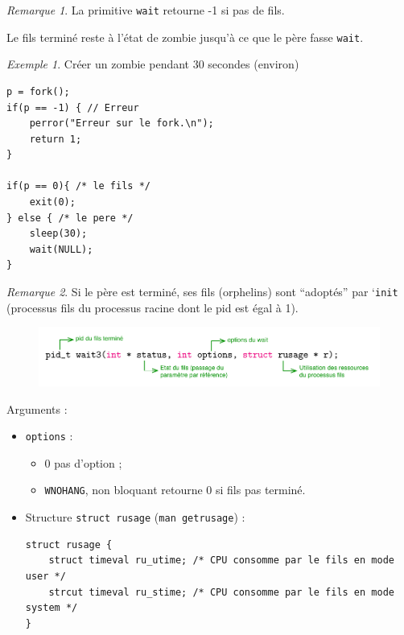 \documentclass[11pt,english,french]{scrreprt}
\theoremstyle{remark}
\newtheorem*{rem*}{Remarque}
\newtheorem*{ex*}{Exemple}
\theoremstyle{definition}
\begin{document}
\begin{rem*}
	La primitive \lstinline!wait! retourne -1 si pas de fils.
	
	Le fils terminé reste à l'état de zombie jusqu'à ce que le père fasse \lstinline!wait!.
\end{rem*}

\begin{ex*}
	Créer un zombie pendant 30 secondes (environ)
\begin{lstlisting}
p = fork();
if(p == -1) { // Erreur
	perror("Erreur sur le fork.\n");
	return 1;
}

if(p == 0){ /* le fils */
	exit(0);
} else { /* le pere */
	sleep(30);
	wait(NULL);
}
\end{lstlisting}
\end{ex*}	 

\begin{rem*}
Si le père est terminé, ses fils (orphelins) sont ``adoptés'' par `\lstinline!init! (processus fils du processus racine dont le pid est égal à 1).
\end{rem*}

\begin{figure}[h!]
	\center
	\vspace{-20pt}
	\includegraphics[scale=.75]{img/wait3}
	\vspace{-10pt}
\end{figure} 
Arguments :\begin{itemize}
	\item \lstinline!options! :\begin{itemize}
		\item 0 pas d'option ;
		\item \lstinline!WNOHANG!, non bloquant retourne 0 si fils pas terminé.
	\end{itemize} 
	\item Structure \lstinline!struct rusage! (\lstinline!man getrusage!) :
\begin{lstlisting}
struct rusage {
	struct timeval ru_utime; /* CPU consomme par le fils en mode user */
	strcut timeval ru_stime; /* CPU consomme par le fils en mode system */
}
\end{lstlisting}
\end{itemize}
\end{document}
